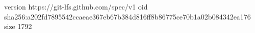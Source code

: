 version https://git-lfs.github.com/spec/v1
oid sha256:a202fd7895542ccaeae367eb67b384d816ff8b86775ce70b1a02b084342ea176
size 1792
